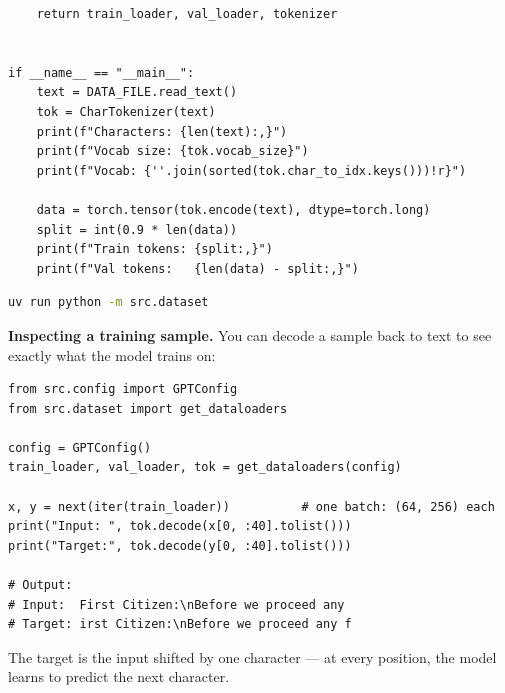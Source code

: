 \begin{lstlisting}
    return train_loader, val_loader, tokenizer


if __name__ == "__main__":
    text = DATA_FILE.read_text()
    tok = CharTokenizer(text)
    print(f"Characters: {len(text):,}")
    print(f"Vocab size: {tok.vocab_size}")
    print(f"Vocab: {''.join(sorted(tok.char_to_idx.keys()))!r}")

    data = torch.tensor(tok.encode(text), dtype=torch.long)
    split = int(0.9 * len(data))
    print(f"Train tokens: {split:,}")
    print(f"Val tokens:   {len(data) - split:,}")
\end{lstlisting}

\shelltag
\begin{lstlisting}[language=bash]
uv run python -m src.dataset
\end{lstlisting}


\textbf{Inspecting a training sample.} You can decode a sample back to text to see exactly what the model trains on:

\demotag
\begin{lstlisting}
from src.config import GPTConfig
from src.dataset import get_dataloaders

config = GPTConfig()
train_loader, val_loader, tok = get_dataloaders(config)

x, y = next(iter(train_loader))          # one batch: (64, 256) each
print("Input: ", tok.decode(x[0, :40].tolist()))
print("Target:", tok.decode(y[0, :40].tolist()))

# Output:
# Input:  First Citizen:\nBefore we proceed any
# Target: irst Citizen:\nBefore we proceed any f
\end{lstlisting}

The target is the input shifted by one character --- at every position, the model learns to predict the next character.

